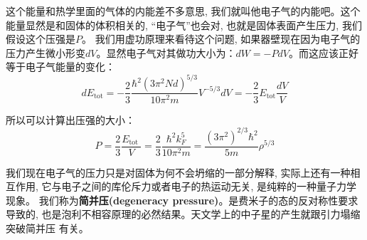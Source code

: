 \documentclass[a4paper,zihao=-4,linespread=1]{ctexrep}
\begin{document}
    这个能量和热学里面的气体的内能差不多意思, 我们就叫他电子气的内能吧。这个能量显然是和固体的体积相关的, “电子气”也会对, 也就是固体表面产生压力, 我们假设这个压强是$P$。
    我们用虚功原理来看待这个问题, 如果器壁现在因为电子气的压力产生微小形变$dV$。显然电子气对其做功大小为：$dW=-PdV$。而这应该正好等于电子气能量的变化：
    \begin{equation}
        d E_{\mathrm{tot}}=-\frac{2}{3} \frac{\hbar^{2}\left(3 \pi^{2} N d\right)^{5 / 3}}{10 \pi^{2} m} V^{-5 / 3} d V=-\frac{2}{3} E_{\mathrm{tot}} \frac{d V}{V}
    \end{equation}
    
    所以可以计算出压强的大小：
    \begin{equation}
        \label{eq:5.32}
        P=\frac{2}{3} \frac{E_{\text {tot }}}{V}=\frac{2}{3} \frac{\hbar^{2} k_{F}^{5}}{10 \pi^{2} m}=\frac{\left(3 \pi^{2}\right)^{2 / 3} \hbar^{2}}{5 m} \rho^{5 / 3}
    \end{equation}
    
    我们现在电子气的压力只是对固体为何不会坍缩的一部分解释, 实际上还有一种相互作用, 它与电子之间的库伦斥力或者电子的热运动无关, 是纯粹的一种量子力学现象。
    我们称为\textbf{简并压(degeneracy pressure)}。是费米子的态的反对称性要求导致的, 也是泡利不相容原理的必然结果。天文学上的中子星的产生就跟引力塌缩突破简并压
    有关。

    
\end{document}
